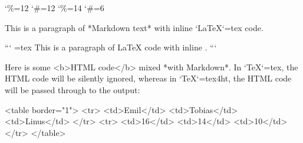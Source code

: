 \documentclass{book}
\begin{document}

\catcode`\%=12\relax
\catcode`\#=12\relax
{}
\catcode`\%=14\relax
\catcode`\#=6\relax

\begin{markdown}
This is a paragraph of *Markdown text* with inline `\LaTeX`{=tex} code.

``` {=tex}
This is a paragraph of \LaTeX{} code with inline .
```
\end{markdown}

\begin{markdown}
Here is some <b>HTML code</b> mixed *with Markdown*. In `\TeX`{=tex}, the HTML
code will be silently ignored, whereas in `\TeX`{=tex}4ht, the HTML code will
be passed through to the output:

<table border="1">
  <tr>
    <td>Emil</td>
    <td>Tobias</td>
    <td>Linus</td>
  </tr>
  <tr>
    <td>16</td>
    <td>14</td>
    <td>10</td>
  </tr>
</table>
\end{markdown}
\end{document}
